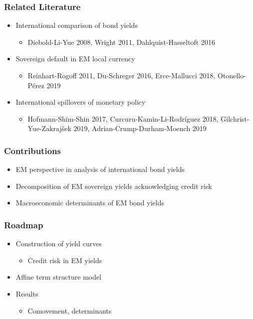 \documentclass[12pt, aspectratio=169, xcolor=dvipsnames]{beamer}  %
\begin{document}
\begin{frame}
	\frametitle{Related Literature}
	\begin{itemize}
		\item International comparison of bond yields
		\begin{itemize}
			\item \footnotesize Diebold-Li-Yue 2008, Wright 2011, Dahlquist-Hasseltoft 2016
		\end{itemize}
		\item Sovereign default in EM local currency
		\begin{itemize}
			\item \footnotesize Reinhart-Rogoff 2011, Du-Schreger 2016, Erce-Mallucci 2018, Otonello-Pérez 2019
		\end{itemize}
		\item International spillovers of monetary policy
		\begin{itemize}
			\item \footnotesize Hofmann-Shim-Shin 2017, Curcuru-Kamin-Li-Rodríguez 2018, Gilchrist-Yue-Zakrajšek 2019, Adrian-Crump-Durham-Moench 2019
		\end{itemize}
	\end{itemize}
\end{frame}

\begin{frame}
	\frametitle{Contributions}
	\begin{itemize}
		\item \alert{EM perspective} in analysis of international bond yields
		\item Decomposition of EM sovereign yields acknowledging \alert{credit risk}
		\item Macroeconomic \alert{determinants} of EM bond yields
	\end{itemize}
\end{frame}

\begin{frame}
	\frametitle{Roadmap}
	\begin{itemize}
		\item Construction of yield curves
		\begin{itemize}
			\item Credit risk in EM yields
		\end{itemize}
		\item Affine term structure model
		\item Results
		\begin{itemize}
			\item Comovement, determinants %
		\end{itemize}
	\end{itemize}
\end{frame}
\end{document}
